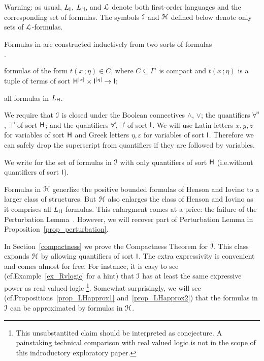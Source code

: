 \documentclass[10pt,oneside]{amsproc}
\newcommand{\mylabel}[1]{{#1}\hfill}
\renewenvironment{itemize}
  {\begin{list}{$\cdot$}{%
  \setlength{\parskip}{0mm}
  \setlength{\topsep}{.4\baselineskip}
  \setlength{\rightmargin}{0mm}
  \setlength{\listparindent}{0mm}
  \setlength{\itemindent}{0mm}
  \setlength{\labelwidth}{3ex}
  \setlength{\itemsep}{.2\baselineskip}
  \setlength{\parsep}{.2\baselineskip}
  \setlength{\partopsep}{0mm}
  \setlength{\labelsep}{1ex}
  \setlength{\leftmargin}{\labelwidth+\labelsep}
  \let\makelabel\mylabel}}{%
\end{list}}
\renewcommand*{\emph}[1]{%
   \smash{\tikz[baseline]\node[rectangle, fill=teal!25, rounded corners, inner xsep=0.5ex, inner ysep=0.2ex, anchor=base, minimum height = 2.7ex]{\strut #1};}}
\newcommand\dangersign[1][2.5ex]{%
  \renewcommand\stacktype{L}%
  \scaleto{\stackon[.5pt]{\LARGE\color{red}$\triangle$}{\color{red}\bfseries\small !}}{#1}%
}
\begin{document}
Warning: as usual, $L_{\sf I}$, $L_{\sf H}$, and ${\EuScript L}$ denote both first-order languages and the corresponding set of formulas.
The symbols ${\EuScript I}$ and ${\EuScript H}$ defined below denote only sets of ${\EuScript L}$-formulas.

\begin{definition}\label{def_LL}
  Formulas in \emph{${\EuScript I}$\/} are constructed inductively from two sorts of \emph{${\EuScript I}$-atomic\/} formulas
  \begin{itemize}
  \item[i.] formulas of the form $t(x\,;\eta)\in C$, where $C\subseteq I^n$ is compact and $t(x\,;\eta)$ is a tuple of terms of sort ${\sf H}^{|x|}\times {\sf I}^{|\eta|}\to {\sf I}$; 
  \item[ii.] all formulas in $L_{\sf H}$.
  \end{itemize}
  We require that ${\EuScript I}$ is closed under the Boolean connectives $\wedge$, $\vee$; the quantifiers $\forall\raisebox{1.1ex}{\scaleto{\sf H}{.8ex}\kern-.2ex}$, $\exists\raisebox{1.1ex}{\scaleto{\sf H}{.8ex}\kern-.2ex}$ of sort ${\sf H}$; and the quantifiers $\forall\raisebox{1.1ex}{\scaleto{\sf I}{.8ex}\kern-.2ex}$, $\exists\raisebox{1.1ex}{\scaleto{\sf I}{.8ex}\kern-.2ex}$ of sort ${\sf I}$.
  We will use Latin letters $x,y,z$ for variables of sort ${\sf H}$ and Greek letters $\eta,\varepsilon$ for variables of sort ${\sf I}$.
  Therefore we can safely drop the superscript from quantifiers if they are followed by variables.

  We write \emph{${\EuScript H}$ \/} for the set of formulas in ${\EuScript I}$ with only quantifiers of sort ${\sf H}$ (i.e.\@ without quantifiers of sort ${\sf I}$).
\end{definition}

Formulas in ${\EuScript H}$ generlize the positive bounded formulas of Henson and Iovino to a larger class of structures.
But ${\EuScript H}$ also enlarges the class of Henson and Iovino as it comprises all $L_{\sf H}$-formulas.
This enlargment comes at a price: the failure of the Perturbation Lemma~\cite[Proposition~5.15]{HI}.
However, we will recover part of Perturbation Lemma in Proposition~\ref{prop_perturbation}.

In Section~\ref{compactness} we prove the Compactness Theorem for ${\EuScript I}$.
This class expands ${\EuScript H}$ by allowing quantifiers of sort ${\sf I}$.
The extra expressivity is convenient and comes almost for free.
For instance, it is easy to see (cf.\@ Example~\ref{ex_Rvlogic} for a hint) that ${\EuScript I}$ has at least the same expressive power as real valued logic%
\footnote{This unsubstantited claim should be interpreted as concjecture.
A painstaking technical comparison with real valued logic is not in the scope of this indroductory exploratory paper.}.
Somewhat surprisingly, we will see (cf.\@ Propositions~\ref{prop_LHapprox1} and~\ref{prop_LHapprox2}) that the formulas in ${\EuScript I}$ can be approximated by formulas in ${\EuScript H}$.
\end{document}
